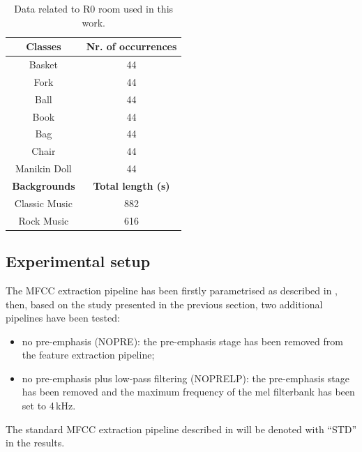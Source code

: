\begin{table}[t]
	\caption{Data related to R0 room used in this work.}
	\label{tab:eswa_dataset}
	\begin{center}
		\begin{tabular}[t]{c|c}
			
			\hline
			\textbf{Classes}  & \textbf{Nr. of occurrences} \\ %
			\hline
			
			Basket      			&   44    	\\
			Fork        			&   44     	\\
			Ball       				&   44    	\\
			Book        			&   44    	\\
			Bag         			&   44    	\\
			Chair       			&   44    	\\
			$\,$ Manikin Doll $\,$ 	&   44    	\\
			\hline
			\textbf{Backgrounds} & \textbf{Total length (s)}\\			
			Classic Music  			&   882   	\\
			Rock Music  			&   616   	\\
			\hline
		\end{tabular}
	\end{center}
\end{table}

\subsection{Experimental setup}
The MFCC extraction pipeline has been firstly parametrised as described in , then, based on the study presented in the previous section, two additional pipelines have been tested:
\begin{itemize}
	\item no pre-emphasis (NOPRE): the pre-emphasis stage has been removed from the feature extraction pipeline;
	\item no pre-emphasis plus low-pass filtering (NOPRELP): the pre-emphasis stage has been removed and the maximum frequency of the mel filterbank has been set to 4\,kHz.
\end{itemize}
The standard MFCC extraction pipeline described in  will be denoted with ``STD'' in the results.

